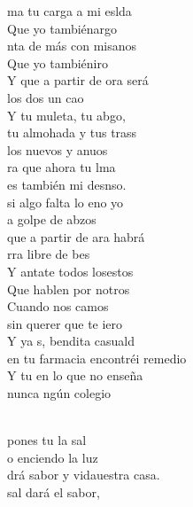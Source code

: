 \documentclass[12pt]{article}
\begin{document}
\begin{multicols*}{2}
\begin{cancion}%
	ma tu carga a mi eslda\\
	Que yo tambiénargo\\
	nta de más con misanos\\
	Que yo tambiéniro\\
	Y  que a partir de ora será\\
	 los dos un cao\\
	Y tu muleta, tu abgo,\\
	tu almohada y tus trass\\
	los nuevos y anuos\\
	ra que ahora tu lma\\
	es también mi desnso.\\
	 si algo falta lo eno yo\\
	a golpe de abzos\\
	que a partir de ara habrá\\
	rra libre de bes\\
	Y antate todos losestos\\
	Que hablen por notros\\
	Cuando nos camos\\
	 sin querer que te iero\\
	Y ya s, bendita casuald\\
	 en tu farmacia encontréi remedio\\
	Y tu en  lo que no enseña  \\
	nunca ngún colegio\\\jump\\
	\begin{chorus}%
	 pones tu la sal \\
	o enciendo la luz\\
	drá sabor y vidauestra casa.\\
	 sal dará el sabor, \\

\end{chorus}
\end{cancion}
\end{multicols*}
\end{document}
